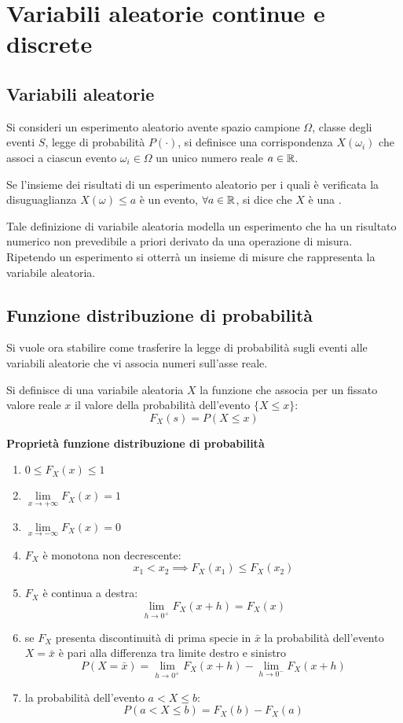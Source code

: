 \chapter{Variabili aleatorie continue e discrete}
\section{Variabili aleatorie}
Si consideri un esperimento aleatorio avente spazio campione $\Omega$, classe degli eventi $S$, legge di probabilità $P(\cdot)$, si definisce una corrispondenza $X(\omega_i)$ che associ a ciascun evento $\omega_i\in\Omega$ un unico numero reale $a\in\mathbb{R}$.

Se l'insieme dei risultati di un esperimento aleatorio per i quali è verificata la disuguaglianza $X(\omega)\leq a$ è un evento, $\forall a\in\mathbb{R}$, si dice che $X$ è una .

Tale definizione di variabile aleatoria modella un esperimento che ha un risultato numerico non prevedibile a priori derivato da una operazione di misura. Ripetendo un esperimento si otterrà un insieme di misure che rappresenta la variabile aleatoria.\\

\section{Funzione distribuzione di probabilità}
Si vuole ora stabilire come trasferire la legge di probabilità sugli eventi alle variabili aleatorie che vi associa numeri sull'asse reale.

Si definisce  di una variabile aleatoria $X$ la funzione che associa per un fissato valore reale $x$ il valore della probabilità dell'evento $\lbrace X\leq x\rbrace$:
\begin{equation}
F_X(s)=P(X\leq x)
\end{equation}\label{eq:funz_dist_prob}

\textbf{Proprietà funzione distribuzione di probabilità}
\begin{enumerate}
\item $0\leq F_X(x)\leq 1$
\item $\lim\limits_{x\to+\infty}F_X(x)=1$
\item $\lim\limits_{x\to-\infty}F_X(x)=0$
\item $F_X$ è monotona non decrescente: \[x_1<x_2\implies F_X(x_1)\leq F_X(x_2)\]
\item $F_X$ è continua a destra: \[\lim\limits_{h\to 0^+}{F_X(x+h)}=F_X(x)\]
\item se $F_X$ presenta discontinuità di prima specie in $\bar{x}$ la probabilità dell'evento $X=\bar{x}$ è pari alla differenza tra limite destro e sinistro \[P(X=\bar{x})=\lim\limits_{h\to 0^+}{F_X(x+h)} - \lim\limits_{h\to 0^-}{F_X(x+h)}\]
\item la probabilità dell'evento $a < X \leq b$:
\[P(a<X\leq b)=F_X(b)-F_X(a)\]
\end{enumerate}

